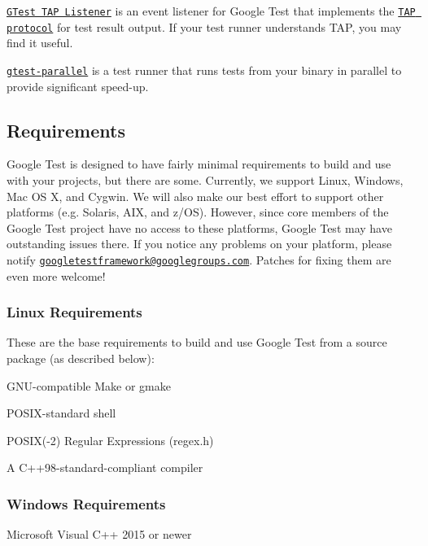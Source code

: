 \href{https://github.com/kinow/gtest-tap-listener}{\tt G\+Test T\+AP Listener} is an event listener for Google Test that implements the \href{https://en.wikipedia.org/wiki/Test_Anything_Protocol}{\tt T\+AP protocol} for test result output. If your test runner understands T\+AP, you may find it useful.

\href{https://github.com/google/gtest-parallel}{\tt gtest-\/parallel} is a test runner that runs tests from your binary in parallel to provide significant speed-\/up.

\subsection*{Requirements}

Google Test is designed to have fairly minimal requirements to build and use with your projects, but there are some. Currently, we support Linux, Windows, Mac OS X, and Cygwin. We will also make our best effort to support other platforms (e.\+g. Solaris, A\+IX, and z/\+OS). However, since core members of the Google Test project have no access to these platforms, Google Test may have outstanding issues there. If you notice any problems on your platform, please notify \href{https://groups.google.com/forum/#!forum/googletestframework}{\tt googletestframework@googlegroups.\+com}. Patches for fixing them are even more welcome!

\subsubsection*{Linux Requirements}

These are the base requirements to build and use Google Test from a source package (as described below)\+:


\begin{DoxyItemize}
\item G\+NU-\/compatible Make or gmake
\item P\+O\+S\+IX-\/standard shell
\item P\+O\+S\+IX(-\/2) Regular Expressions (regex.\+h)
\item A C++98-\/standard-\/compliant compiler
\end{DoxyItemize}

\subsubsection*{Windows Requirements}


\begin{DoxyItemize}
\item Microsoft Visual C++ 2015 or newer
\end{DoxyItemize}

